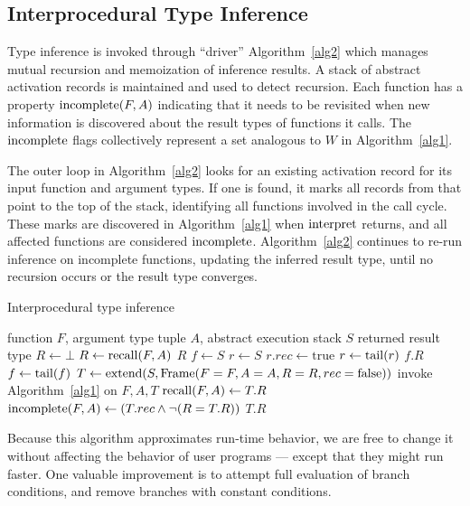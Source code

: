 \subsection{Interprocedural Type Inference}

Type inference is invoked through ``driver'' Algorithm~\ref{alg2}
which manages mutual recursion and memoization of inference results.
A stack of abstract activation records is maintained and used to detect
recursion. Each function has a property $\operatorname{incomplete}(F,A)$ indicating that
it needs to be revisited when new information is discovered about the
result types of functions it calls. The $\operatorname{incomplete}$ flags collectively
represent a set analogous to $W$ in Algorithm~\ref{alg1}.

The outer loop in Algorithm~\ref{alg2} looks for an existing activation
record for its input function and argument types. If one is found, it
marks all records from that point to the top of the stack, identifying
all functions involved in the call cycle. These marks
are discovered in Algorithm~\ref{alg1} when $\operatorname{interpret}$ returns, and all
affected functions are considered $\operatorname{incomplete}$. Algorithm~\ref{alg2}
continues to re-run inference on incomplete functions, updating the
inferred result type, until no recursion occurs or the result type
converges.

\begin{algorithm}
\caption{Interprocedural type inference}
\label{alg2}
\begin{algorithmic}
\REQUIRE function $F$, argument type tuple $A$, abstract execution stack $S$
\ENSURE returned result type
\STATE $R \leftarrow \bot$
 \STATE $R \leftarrow \operatorname{recall}(F,A)$
  \RETURN $R$
 \ENDIF
\ENDIF
\STATE $f \leftarrow S$
  \STATE $r \leftarrow S$
   \STATE $r.rec \leftarrow \text{true}$
   \STATE $r \leftarrow \operatorname{tail}(r)$
  \ENDWHILE
  \RETURN $f.R$
 \ENDIF
 \STATE $f \leftarrow \operatorname{tail}(f)$
\ENDWHILE
\STATE $T \leftarrow \operatorname{extend}(S, \operatorname{Frame}(F=F,A=A,R=R,rec=\text{false}))$
\STATE invoke Algorithm~\ref{alg1} on $F,A,T$
\STATE $\operatorname{recall}(F,A) \leftarrow T.R$
\STATE $\operatorname{incomplete}(F,A) \leftarrow (T.rec \land \neg(R=T.R))$
\RETURN $T.R$
\end{algorithmic}
\end{algorithm}

Because this algorithm approximates run-time behavior, we are free to
change it without affecting the behavior of user programs --- except
that they might run faster. One valuable improvement is
to attempt full evaluation of branch conditions, and remove branches
with constant conditions.


